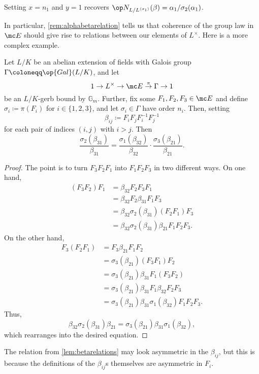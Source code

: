 \documentclass{article}
\numberwithin{equation}{section}
\begin{document}
\begin{remark} \label{rem:alphabetarelation}
	Setting $x=n_1$ and $y=1$ recovers $\op N_{L/L^{\langle\sigma_1\rangle}}(\beta)=\alpha_1/\sigma_2(\alpha_1)$.
\end{remark}
In particular, \autoref{rem:alphabetarelation} tells us that coherence of the group law in $\mc E$ should give rise to relations between our elements of $L^\times$. Here is a more complex example.
\begin{lemma} \label{lem:betarelations}
	Let $L/K$ be an abelian extension of fields with Galois group $\Gamma\coloneqq\op{Gal}(L/K)$, and let 
	\[1\to L^\times\to\mc E\stackrel\pi\to\Gamma\to1\]
	be an $L/K$-gerb bound by $\mathbb G_m$. Further, fix some $F_1,F_2,F_3\in\mc E$ and define $\sigma_i\coloneqq\pi(F_i)$ for $i\in\{1,2,3\}$, and let $\sigma_i\in\Gamma$ have order $n_i$. Then, setting
	\[\beta_{ij}\coloneqq F_iF_jF_i^{-1}F_j^{-1}\]
	for each pair of indices $(i,j)$ with $i>j$. Then
	\[\frac{\sigma_2(\beta_{31})}{\beta_{31}}=\frac{\sigma_1(\beta_{32})}{\beta_{32}}\cdot\frac{\sigma_3(\beta_{21})}{\beta_{21}}.\]
\end{lemma}
\begin{proof}
	The point is to turn $F_3F_2F_1$ into $F_1F_2F_3$ in two different ways. On one hand,
	\begin{align*}
		(F_3F_2)F_1 &= \beta_{32}F_2F_3F_1 \\
		&= \beta_{32}F_2\beta_{31}F_1F_3 \\
		&= \beta_{32}\sigma_2(\beta_{31})(F_2F_1)F_3 \\
		&= \beta_{32}\sigma_2(\beta_{31})\beta_{21}F_1F_2F_3.
	\end{align*}
	On the other hand,
	\begin{align*}
		F_3(F_2F_1) &= F_3\beta_{21}F_1F_2 \\
		&= \sigma_3(\beta_{21})(F_3F_1)F_2 \\
		&= \sigma_3(\beta_{21})\beta_{31}F_1(F_3F_2) \\
		&= \sigma_3(\beta_{21})\beta_{31}F_1\beta_{32}F_2F_3 \\
		&= \sigma_3(\beta_{21})\beta_{31}\sigma_1(\beta_{32})F_1F_2F_3.
	\end{align*}
	Thus,
	\[\beta_{32}\sigma_2(\beta_{31})\beta_{21}=\sigma_3(\beta_{21})\beta_{31}\sigma_1(\beta_{32}),\]
	which rearranges into the desired equation.
\end{proof}
\begin{remark}
	The relation from \autoref{lem:betarelations} may look asymmetric in the $\beta_{ij}$, but this is because the definitions of the $\beta_{ij}$s themselves are asymmetric in $F_i$.
\end{remark}
\end{document}
